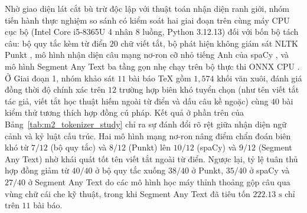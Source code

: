Nhờ giao diện lát cắt bù trừ độc lập với thuật toán nhận diện ranh giới, nhóm tiến hành thực nghiệm so sánh có kiểm soát hai giai đoạn trên cùng máy CPU cục bộ (Intel Core i5-8365U 4 nhân 8 luồng, Python 3.12.13) đối với bốn bộ tách câu: bộ quy tắc kèm từ điển $20$ chữ viết tắt, bộ phát hiện không giám sát NLTK Punkt \cite{kiss2006}, mô hình nhận diện câu mạng nơ-ron cỡ nhỏ tiếng Anh của spaCy \cite{spacy}, và mô hình Segment Any Text ba tầng gọn nhẹ chạy trên bộ thực thi ONNX CPU \cite{frohmann2024}. Ở Giai đoạn 1, nhóm khảo sát $11$ bài báo TeX gồm $1{,}574$ khối văn xuôi, đánh giá đồng thời độ chính xác trên $12$ trường hợp biên khó tuyển chọn (như tên viết tắt tác giả, viết tắt học thuật hiếm ngoài từ điển và dấu câu kề ngoặc) cùng $40$ bài kiểm thử tương thích hợp đồng cú pháp. Kết quả ở phần trên của Bảng~\ref{tab:m2_tokenizer_study} chỉ ra sự đánh đổi rõ rệt giữa nhận diện ngữ cảnh và kỷ luật cấu trúc. Hai mô hình mạng nơ-ron nâng điểm chẩn đoán biên khó từ $7/12$ (bộ quy tắc) và $8/12$ (Punkt) lên $10/12$ (spaCy) và $9/12$ (Segment Any Text) nhờ khái quát tốt tên viết tắt ngoài từ điển. Ngược lại, tỷ lệ tuân thủ hợp đồng giảm từ $40/40$ ở bộ quy tắc xuống $38/40$ ở Punkt, $35/40$ ở spaCy và $27/40$ ở Segment Any Text do các mô hình học máy thỉnh thoảng gộp câu qua vùng chữ cái che kỹ thuật, trong khi Segment Any Text đã tiêu tốn $222.13\text{ s}$ chỉ trên $11$ bài báo.

